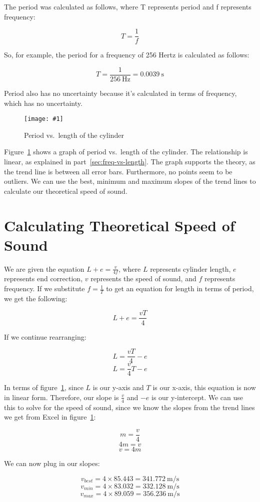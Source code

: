 \documentclass{report}
\newcommand{\graph}[2]{
  \begin{figure}[H]
    \medskip
    \centering
    \texttt{[image: \#1]}
    \caption{#2}
    \medskip\label{fig:#1}
  \end{figure}
}
\begin{document}
The period was calculated as follows, where T represents period and f
represents frequency:

\[T=\frac{1}{f}\]

So, for example, the period for a frequency of 256 Hertz is
calculated as follows:

\[T=\frac{1}{\SI{256}{\hertz}}=\SI{0.0039}{\second}\]

Period also has no uncertainty because it's calculated in terms of
frequency, which has no uncertainty.

\graph{period-vs-length}{Period vs.\ length of the cylinder}

Figure~\ref{fig:period-vs-length} shows a graph of period vs.\ length
of the cylinder. The relationship is linear, as explained in
part~\ref{sec:freq-vs-length}. The graph supports the theory, as the
trend line is between all error bars. Furthermore, no points seem to
be outliers. We can use the best, minimum and maximum slopes of the
trend lines to calculate our theoretical speed of sound.

\section{Calculating Theoretical Speed of Sound}\label{sec:theoretical-speed}

We are given the equation \(L+e=\frac{v}{4f}\), where \(L\) represents cylinder
length, \(e\) represents end correction, \(v\) represents the speed of sound,
and \(f\) represents frequency. If we substitute \(f=\frac{1}{T}\) to get
an equation for length in terms of period, we get the following:

\[L+e=\frac{vT}{4}\]

If we continue rearranging:

\[L=\frac{vT}{4}-e\]
\[L=\frac{v}{4}T-e\]

In terms of figure~\ref{fig:period-vs-length}, since \(L\) is our
y-axis and \(T\) is our x-axis, this equation is now in linear form.
Therefore, our slope is \(\frac{v}{4}\) and \(-e\) is our
y-intercept. We can use this to solve for the speed of sound, since
we know the slopes from the trend lines we get from Excel in
figure~\ref{fig:period-vs-length}:

\[m=\frac{v}{4}\]
\[4m=v\]
\[v=4m\]

We can now plug in our slopes:

\[v_{best}=4\times85.443=\SI{341.772}{\metre\per\second}\]
\[v_{min}=4\times83.032=\SI{332.128}{\metre\per\second}\]
\[v_{max}=4\times89.059=\SI{356.236}{\metre\per\second}\]
\end{document}
